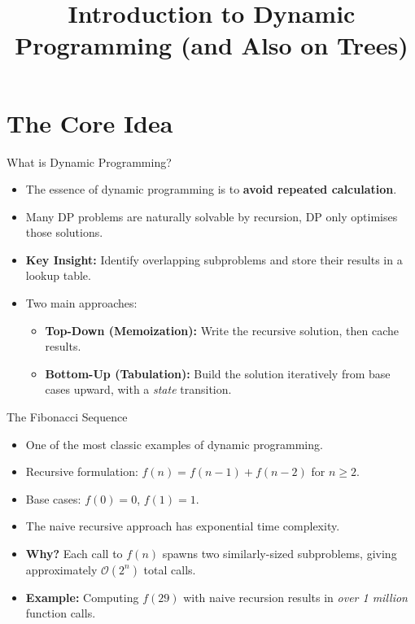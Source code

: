 \documentclass{beamer}
\begin{document}
\title{Introduction to Dynamic Programming (and Also on Trees)}
\date{}

\begin{frame}[plain]
    \titlepage
\end{frame}

\section{The Core Idea}

\begin{frame}{What is Dynamic Programming?}
    \begin{itemize}
        \item The essence of dynamic programming is to \textbf{avoid repeated calculation}.
        \item Many DP problems are naturally solvable by recursion, DP only optimises those solutions.
        \item \textbf{Key Insight:} Identify overlapping subproblems and store their results in a lookup table.
        \item Two main approaches:
        \begin{itemize}
            \item \textbf{Top-Down (Memoization):} Write the recursive solution, then cache results.
            \item \textbf{Bottom-Up (Tabulation):} Build the solution iteratively from base cases upward, with a \textit{state} transition.
        \end{itemize}
    \end{itemize}
\end{frame}

\begin{frame}{The Fibonacci Sequence}
    \begin{itemize}
        \item One of the most classic examples of dynamic programming.
        \item Recursive formulation: $f(n) = f(n-1) + f(n-2)$ for $n \ge 2$.
        \item Base cases: $f(0) = 0$, $f(1) = 1$.
        \item The naive recursive approach has exponential time complexity.
        \item \textbf{Why?} Each call to $f(n)$ spawns two similarly-sized subproblems, giving approximately $\mathcal{O}(2^n)$ total calls.
        \item \textbf{Example:} Computing $f(29)$ with naive recursion results in \textit{over 1 million} function calls.
    \end{itemize}
\end{frame}
\end{document}
